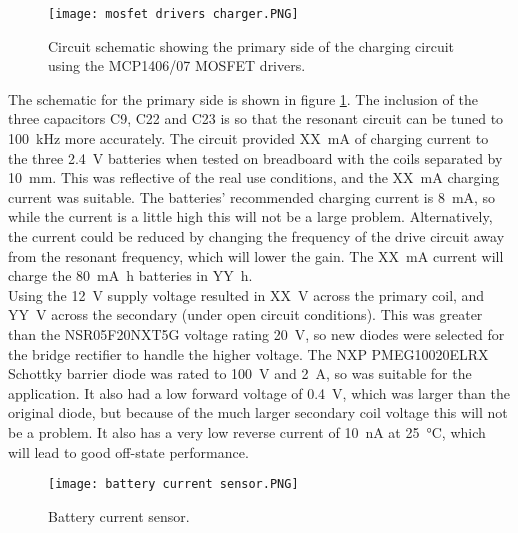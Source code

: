 \begin{figure}[htbp]
	\centering
	\texttt{[image: mosfet drivers charger.PNG]}
	\caption{Circuit schematic showing the primary side of the charging circuit using the MCP1406/07 MOSFET drivers.}
	\label{fig: mosfet drivers charger}
\end{figure}

 
The schematic for the primary side is shown in figure \ref{fig: mosfet drivers charger}. The inclusion of the three capacitors C9, C22 and C23 is so that the resonant circuit can be tuned to \SI{100}{\kilo\hertz} more accurately. The circuit provided \SI{XX}{\milli\ampere} of charging current to the three \SI{2.4}{\volt} batteries when tested on breadboard with the coils separated by \SI{10}{\milli\metre}. This was reflective of the real use conditions, and the \SI{XX}{\milli\ampere} charging current was suitable. The batteries' recommended charging current is \SI{8}{\milli\ampere}, so while the current is a little high this will not be a large problem. Alternatively, the current could be reduced by changing the frequency of the drive circuit away from the resonant frequency, which will lower the gain. The \SI{XX}{\milli\ampere} current will charge the \SI{80}{\milli\ampere\hour} batteries in \SI{YY}{\hour}.\\

Using the \SI{12}{\volt} supply voltage resulted in \SI{XX}{\volt} across the primary coil, and \SI{YY}{\volt} across the secondary (under open circuit conditions). This was greater than the NSR05F20NXT5G voltage rating \SI{20}{\volt}, so new diodes were selected for the bridge rectifier to handle the higher voltage. The NXP PMEG10020ELRX Schottky barrier diode \cite{new_diode} was rated to \SI{100}{\volt} and \SI{2}{\ampere}, so was suitable for the application. It also had a low forward voltage of \SI{0.4}{\volt}, which was larger than the original diode, but because of the much larger secondary coil voltage this will not be a problem. It also has a very low reverse current of \SI{10}{\nano\ampere} at \SI{25}{\celsius}, which will lead to good off-state performance.\\




\begin{figure}[htbp]
	\centering
	\texttt{[image: battery current sensor.PNG]}
	\caption{Battery current sensor.}
	\label{fig: battery current sensor}
\end{figure}

